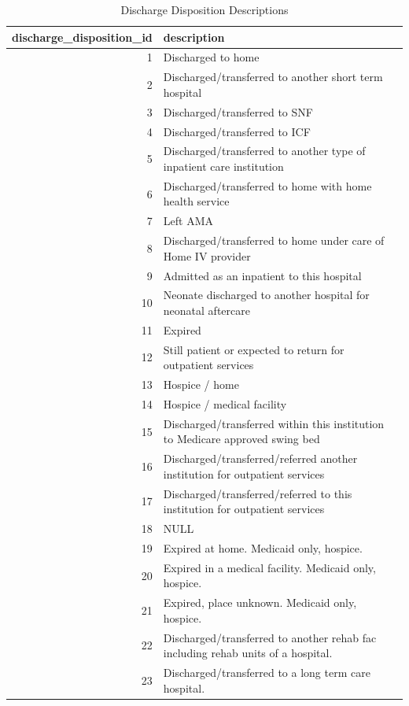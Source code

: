 \begin{table}[H]
    \centering
    \caption{Discharge Disposition Descriptions}
    \renewcommand{\arraystretch}{1.2}
    \begin{tabularx}{\textwidth}{rX}
    \toprule
    \textbf{discharge\_disposition\_id} & \textbf{description} \\
    \midrule
    1 & Discharged to home \\
    2 & Discharged/transferred to another short term hospital \\
    3 & Discharged/transferred to SNF \\
    4 & Discharged/transferred to ICF \\
    5 & Discharged/transferred to another type of inpatient care institution \\
    6 & Discharged/transferred to home with home health service \\
    7 & Left AMA \\
    8 & Discharged/transferred to home under care of Home IV provider \\
    9 & Admitted as an inpatient to this hospital \\
    10 & Neonate discharged to another hospital for neonatal aftercare \\
    11 & Expired \\
    12 & Still patient or expected to return for outpatient services \\
    13 & Hospice / home \\
    14 & Hospice / medical facility \\
    15 & Discharged/transferred within this institution to Medicare approved swing bed \\
    16 & Discharged/transferred/referred another institution for outpatient services \\
    17 & Discharged/transferred/referred to this institution for outpatient services \\
    18 & NULL \\
    19 & Expired at home. Medicaid only, hospice. \\
    20 & Expired in a medical facility. Medicaid only, hospice. \\
    21 & Expired, place unknown. Medicaid only, hospice. \\
    22 & Discharged/transferred to another rehab fac including rehab units of a hospital. \\
    23 & Discharged/transferred to a long term care hospital. \\

\end{tabularx}
\end{table}
